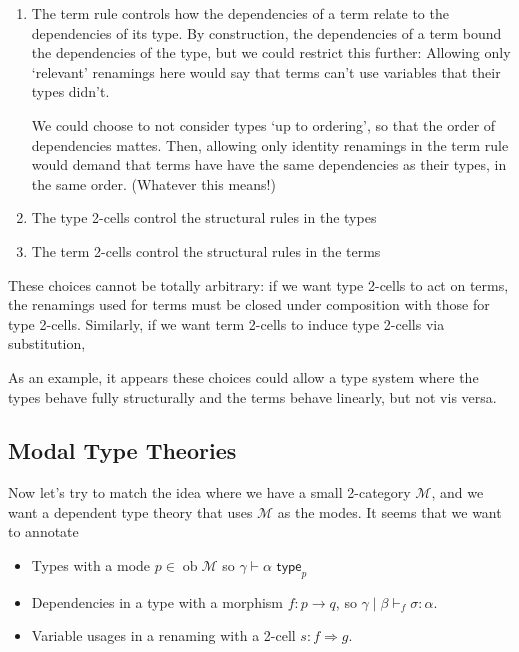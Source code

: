 \documentclass[10pt]{article}
\newcommand{\yields}{\vdash}
\newcommand{\type}{\,\,\mathsf{type}}
\DeclareMathOperator{\ob}{ob}
\begin{document}
\begin{enumerate}
\item The term rule controls how the dependencies of a term relate to the dependencies of its type. By construction, the dependencies of a term bound the dependencies of the type, but we could restrict this further: Allowing only `relevant' renamings here would say that terms can't use variables that their types didn't.

We could choose to not consider types `up to ordering', so that the order of dependencies mattes. Then, allowing only identity renamings in the term rule would demand that terms have have the same dependencies as their types, in the same order. (Whatever this means!)

\item The type 2-cells control the structural rules in the types
\item The term 2-cells control the structural rules in the terms
\end{enumerate}

These choices cannot be totally arbitrary: if we want type 2-cells to act on terms, the renamings used for terms must be closed under composition with those for type 2-cells. Similarly, if we want term 2-cells to induce type 2-cells via substitution, 

As an example, it appears these choices could allow a type system where the types behave fully structurally and the terms behave linearly, but not vis versa.

\subsection{Modal Type Theories}
\newcommand{\Modes}{\mathcal{M}}

Now let's try to match the idea where we have a small 2-category $\Modes$, and we want a dependent type theory that uses $\Modes$ as the modes. It seems that we want to annotate
\begin{itemize}
\item Types with a mode $p \in \ob \Modes$ so $\gamma \yields \alpha \type_p$
\item Dependencies in a type with a morphism $f : p \to q$, so $\gamma \mid \beta \yields_f \sigma : \alpha$.
\item Variable usages in a renaming with a 2-cell $s : f \Rightarrow g$.
\end{itemize}
\end{document}
